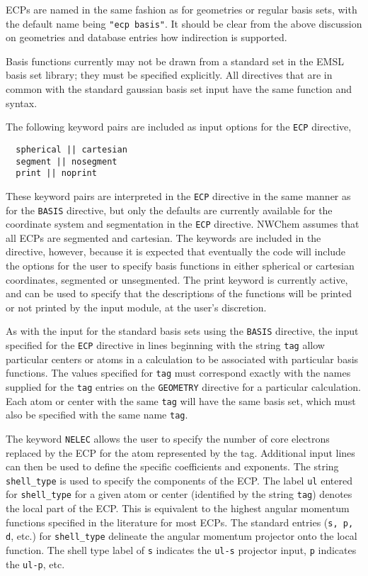 ECPs are named in the same fashion as for geometries or regular basis
sets, with the default name being \verb+"ecp basis"+.  It should be
clear from the above discussion on geometries and database entries how
indirection is supported.

Basis functions currently may not be drawn from a standard set in the
EMSL basis set library; they must be specified explicitly.  All
directives that are in common with the standard gaussian basis set
input have the same function and syntax.

The following keyword pairs are included as input options for the 
\verb+ECP+ directive,

\begin{verbatim}
  spherical || cartesian
  segment || nosegment
  print || noprint
\end{verbatim}

These keyword pairs are interpreted in the \verb+ECP+ directive in the
same manner as for the \verb+BASIS+ directive, but only the defaults
are currently available for the coordinate system and segmentation in
the \verb+ECP+ directive.  NWChem assumes that all ECPs are segmented
and cartesian.  The keywords are included in the directive, however,
because it is expected that eventually the code will include the
options for the user to specify basis functions in either spherical or
cartesian coordinates, segmented or unsegmented.  The print keyword is
currently active, and can be used to specify that the descriptions of
the functions will be printed or not printed by the input module, at
the user's discretion.

As with the input for the standard basis sets using the \verb+BASIS+
directive, the input specified for the \verb+ECP+ directive in lines
beginning with the string \verb+tag+ allow particular centers or atoms
in a calculation to be associated with particular basis functions.
The values specified for \verb+tag+ must correspond exactly with the
names supplied for the \verb+tag+ entries on the \verb+GEOMETRY+
directive for a particular calculation.  Each atom or center with the
same \verb+tag+ will have the same basis set, which must also be
specified with the same name \verb+tag+.

The keyword \verb+NELEC+ allows the user to specify the number of core
electrons replaced by the ECP for the atom represented by the tag.
Additional input lines can then be used to define the specific
coefficients and exponents.  The string \verb+shell_type+ is used to
specify the components of the ECP.  The label \verb+ul+ entered for
\verb+shell_type+ for a given atom or center (identified by the string
\verb+tag+) denotes the local part of the ECP.  This is equivalent to
the highest angular momentum functions specified in the literature for
most ECPs.  The standard entries (\verb+s, p, d+, etc.) for
\verb+shell_type+ delineate the angular momentum projector onto the
local function.  The shell type label of \verb+s+ indicates the
\verb+ul-s+ projector input, \verb+p+ indicates the \verb+ul-p+, etc.

